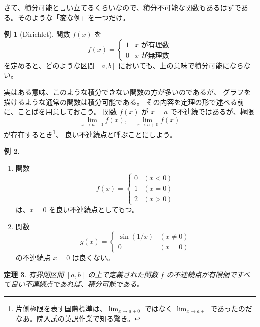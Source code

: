 \documentclass[a4paper]{jsarticle}
\newtheorem{Theorem}{定理}[section]
\theoremstyle{definition}
\newtheorem{Example}[Theorem]{例}
\theoremstyle{remark}
\begin{document}
さて、積分可能と言い立てるくらいなので、積分不可能な関数もあるはずである。そのような「変な例」を一つだけ。

\begin{Example}[Dirichlet]
関数 $f(x)$ を
\[
f(x) = 
\begin{cases}
1 &\text{$x$ が有理数}\\
0 &\text{$x$ が無理数}
\end{cases}
\]
を定めると、どのような区間 $[a,b]$ においても、上の意味で積分可能にならない。
\end{Example}

実はある意味、このような積分できない関数の方が多いのであるが、
グラフを描けるような通常の関数は積分可能である。
その内容を定理の形で述べる前に、ことばを用意しておこう。
関数 $f(x)$ が $x=a$ で不連続ではあるが、極限
\[
\lim_{x\to a-0}f(x), 
\quad 
\lim_{x\to a+0}f(x)
\]
が存在するとき\footnote{片側極限を表す国際標準は、$\lim_{x \to a\pm 0}$ ではなく 
  $\lim_{x \to a\pm}$ であったのだなあ。院入試の英訳作業で知る驚き。}、
良い不連続点と呼ぶことにしよう。

\begin{Example}~ 
\begin{enumerate}
\item
関数
\[
f(x) = 
\begin{cases}
0 & (x < 0)\\
1 & (x=0)\\
2 & (x>0)
\end{cases}
\]
は、$x=0$ を良い不連続点としてもつ。
\item
関数
\[
g(x) = 
\begin{cases}
\sin(1/x) &(x\not= 0)\\
0 &(x=0)
\end{cases}
\]
の不連続点 $x=0$ は良くない。
\end{enumerate}
\end{Example}


\begin{Theorem}
有界閉区間 $[a,b]$ の上で定義された関数 $f$ の不連続点が有限個ですべて良い不連続点であれば、積分可能である。
\end{Theorem}
\end{document}
